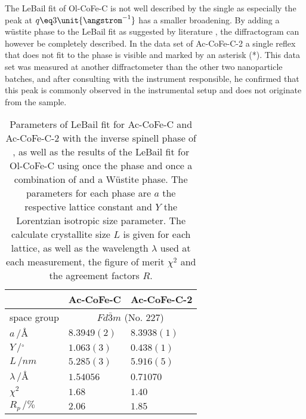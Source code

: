 \documentclass[\main/dresen_thesis.tex]{subfiles}
\begin{document}
  The LeBail fit of Ol-CoFe-C is not well described by the single  as especially the peak at $q \eq 3 \unit{\angstrom^{-1}}$ has a smaller broadening.
  By adding a w\"ustite phase to the LeBail fit as suggested by literature \cite{Bodnarchuk_2009_Excha}, the diffractogram can however be completely described.
  In the data set of Ac-CoFe-C-2 a single reflex that does not fit to the phase is visible and marked by an asterisk (*).
  This data set was measured at another diffractometer than the other two nanoparticle batches, and after consulting with the instrument responsible, he confirmed that this peak is commonly observed in the instrumental setup and does not originate from the sample.
  \begin{table}[ht]
    \centering
    \caption{\label{tab:monolayers:nanoparticle:discussion:xrdLeBail}Parameters of LeBail fit for Ac-CoFe-C and Ac-CoFe-C-2 with the inverse spinell phase of , as well as the results of the LeBail fit for Ol-CoFe-C using once the  phase and once a combination of  and a W\"ustite phase. The parameters for each phase are $a$ the respective lattice constant and $Y$ the Lorentzian isotropic size parameter. The calculate crystallite size $L$ is given for each lattice, as well as the wavelength $\lambda$ used at each measurement, the figure of merit $\chi^2$ and the agreement factors $R$.}
    \begin{tabular}{ l | l | l }
      \hline
      \rule{0pt}{2ex}                                 & \textbf{Ac-CoFe-C} & \textbf{Ac-CoFe-C-2} \\
      \hline
      \rule{0pt}{2ex}space group & \multicolumn{2}{c}{$Fd\bar{3}m$ (No. 227)} \\
      \hline
      \rule{0pt}{2ex} $a \,/ \unit{\angstrom}$        & $8.3949(2)$        & $8.3938(1)$\\
      \rule{0pt}{2ex} $Y \,/ \unit{^\circ}$           & $1.063(3)$         & $0.438(1)$ \\
      \hline
      \rule{0pt}{2ex} $L \,/ \unit{nm}$               & $5.285(3)$         & $5.916(5)$ \\
      \hline
      \rule{0pt}{2ex} $\lambda \,/ \unit{\angstrom}$  & $1.54056$          & $0.71070$ \\
      \hline
      \rule{0pt}{2ex} $\chi^2$                        & $1.68$             & $1.40$ \\
      \rule{0pt}{2ex} $R_p \,/ \unit{\%}$                           & $2.06$             & $1.85$ \\

\end{tabular}
\end{table}
\end{document}
